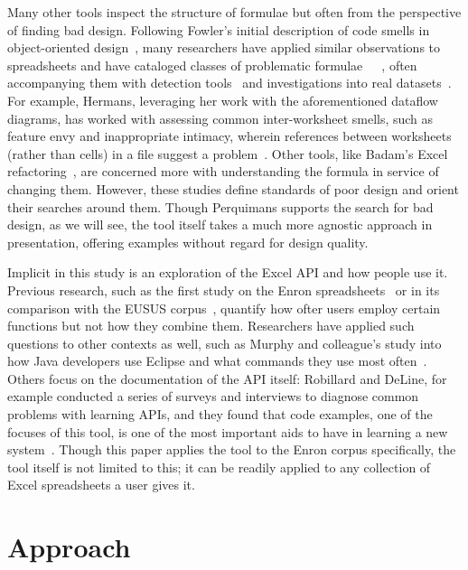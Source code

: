 \documentclass[conference]{IEEEtran}
\newcommand{\toolname}{Perquimans }
\begin{document}
	Many other tools inspect the structure of formulae but often from the
	perspective of finding bad design.  Following Fowler's initial description of
	code smells in object-oriented design~\cite{fowler2009refactoring}, many
	researchers have applied similar observations to spreadsheets and have
	cataloged classes of problematic formulae~\cite{hermans2012detecting}~\cite{cunha2012towards}~\cite{asavametha2012detecting}, often accompanying them
	with detection tools~\cite{abreu2014smelling} and investigations into real datasets~\cite{jansen2015code}. For example, Hermans, leveraging her work with the
	aforementioned dataflow diagrams, has worked with assessing common
	inter-worksheet smells, such as feature envy and inappropriate intimacy,
	wherein references between worksheets (rather than cells) in a file suggest a
	problem~\cite{hermans2012detectinginter}. Other tools, like Badam's Excel
	refactoring~\cite{badame2012refactoring}, are concerned more with understanding
	the formula in service of changing them. However, these studies define
	standards of poor design and orient their searches around them. Though
	\toolname supports the search for bad design, as we will see, the tool itself
	takes a much more agnostic approach in presentation, offering examples without
	regard for design quality. \par
	
	Implicit in this study is an exploration of the Excel API and how people use
	it. Previous research, such as the first study on the Enron spreadsheets~\cite{hermans2015enron} or in its comparison with the EUSUS corpus~\cite{jansen2015enron}, quantify how ofter users employ certain functions but
	not how they combine them. Researchers have applied such questions to other
	contexts as well, such as Murphy and colleague's study into how Java developers
	use Eclipse and what commands they use most often~\cite{murphy2006java}. Others
	focus on the documentation of the API itself: Robillard and DeLine, for example
	conducted a series of surveys and interviews to diagnose common problems with
	learning APIs, and they found that code examples, one of the focuses of this
	tool, is one of the most important aids to have in learning a new system~\cite{robillard2011field}. Though this paper applies the tool to the Enron
	corpus specifically, the tool itself is not limited to this; it can be readily
	applied to any collection of Excel spreadsheets a user gives it.
	
	\section{Approach}
	
\end{document}
